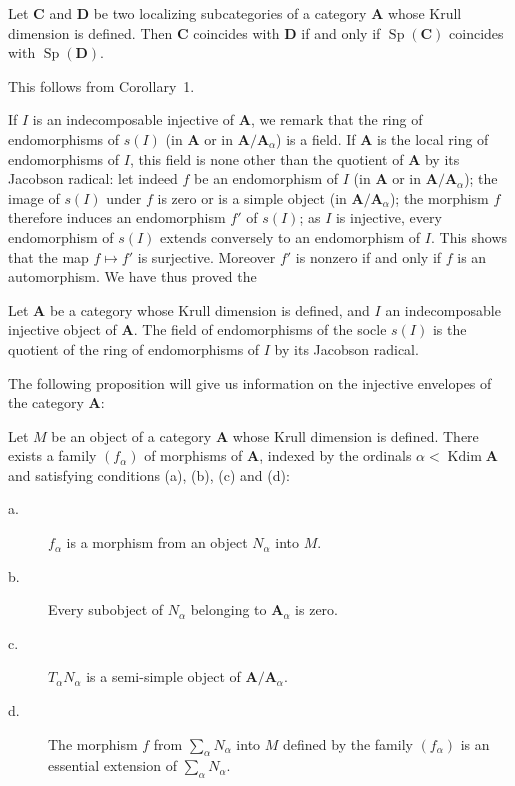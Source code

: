 \begin{corollary}
Let $\mathbf{C}$ and $\mathbf{D}$ be two localizing subcategories of
a category $\mathbf{A}$ whose Krull dimension is defined. Then
$\mathbf{C}$ coincides with $\mathbf{D}$ if and only if
$\operatorname{Sp}(\mathbf{C})$ coincides with
$\operatorname{Sp}(\mathbf{D})$.
\end{corollary}

This follows from Corollary~1.

If $I$ is an indecomposable injective of $\mathbf{A}$, we remark that
the ring of endomorphisms of $s(I)$ (in $\mathbf{A}$ or in
$\mathbf{A}/\mathbf{A}_\alpha$) is a field. If $\mathbf{A}$ is the
local ring of endomorphisms of $I$, this field is none other than the
quotient of $\mathbf{A}$ by its Jacobson radical: let indeed $f$ be an
endomorphism of $I$ (in $\mathbf{A}$ or in
$\mathbf{A}/\mathbf{A}_\alpha$); the image of $s(I)$ under $f$ is zero
or is a simple object (in $\mathbf{A}/\mathbf{A}_\alpha$); the
morphism $f$ therefore induces an endomorphism $f'$ of $s(I)$; as $I$
is injective, every endomorphism of $s(I)$ extends conversely to an
endomorphism of $I$. This shows that the map $f \mapsto f'$ is
surjective. Moreover $f'$ is nonzero if and only if $f$ is an
automorphism. We have thus proved the

\begin{proposition}
Let $\mathbf{A}$ be a category whose Krull dimension is defined, and
$I$ an indecomposable injective object of $\mathbf{A}$. The field of
endomorphisms of the socle $s(I)$ is the quotient of the ring of
endomorphisms of $I$ by its Jacobson radical.
\end{proposition}

The following proposition will give us information on the injective
envelopes of the category $\mathbf{A}$:

\begin{proposition}
Let $M$ be an object of a category $\mathbf{A}$ whose Krull dimension
is defined. There exists a family $(f_\alpha)$ of morphisms of
$\mathbf{A}$, indexed by the ordinals
$\alpha < \operatorname{Kdim} \mathbf{A}$ and satisfying conditions
(a), (b), (c) and (d):
\begin{description}
\item[\normalfont a.] $f_\alpha$ is a morphism from an object
      $N_\alpha$ into $M$.
\item[\normalfont b.] Every subobject of $N_\alpha$ belonging to
      $\mathbf{A}_\alpha$ is zero.
\item[\normalfont c.] $T_\alpha N_\alpha$ is a semi-simple object of
      $\mathbf{A}/\mathbf{A}_\alpha$.
\item[\normalfont d.] The morphism $f$ from $\sum_\alpha N_\alpha$
      into $M$ defined by the family $(f_\alpha)$ is an essential
      extension of $\sum_\alpha N_\alpha$.
\end{description}
\end{proposition}

